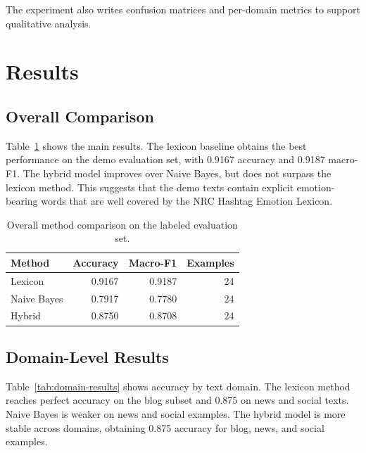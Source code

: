 \documentclass[11pt]{article}
\begin{document}
The experiment also writes confusion matrices and per-domain metrics to support qualitative analysis.

\section{Results}

\subsection{Overall Comparison}

Table~\ref{tab:main-results} shows the main results. The lexicon baseline obtains the best performance on the demo evaluation set, with 0.9167 accuracy and 0.9187 macro-F1. The hybrid model improves over Naive Bayes, but does not surpass the lexicon method. This suggests that the demo texts contain explicit emotion-bearing words that are well covered by the NRC Hashtag Emotion Lexicon.

\begin{table}[h]
\centering
\small
\begin{tabular}{lrrr}
\toprule
\textbf{Method} & \textbf{Accuracy} & \textbf{Macro-F1} & \textbf{Examples} \\
\midrule
Lexicon & 0.9167 & 0.9187 & 24 \\
Naive Bayes & 0.7917 & 0.7780 & 24 \\
Hybrid & 0.8750 & 0.8708 & 24 \\
\bottomrule
\end{tabular}
\caption{Overall method comparison on the labeled evaluation set.}
\label{tab:main-results}
\end{table}

\subsection{Domain-Level Results}

Table~\ref{tab:domain-results} shows accuracy by text domain. The lexicon method reaches perfect accuracy on the blog subset and 0.875 on news and social texts. Naive Bayes is weaker on news and social examples. The hybrid model is more stable across domains, obtaining 0.875 accuracy for blog, news, and social examples.
\end{document}
